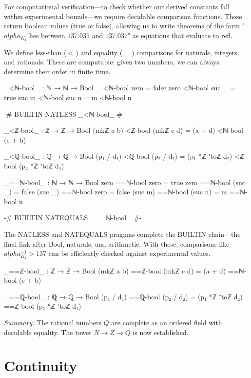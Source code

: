 \documentclass[11pt,a4paper]{book}
\def\alpha{alpha}%
\def\mathbb#1{#1}%
\def\texttt#1{#1}%
\begin{document}
For computational verification—to check whether our derived constants fall within experimental 
bounds—we require decidable comparison functions. These return boolean values (\texttt{true} 
or \texttt{false}), allowing us to write theorems of the form "$\alpha_{K_4}$ lies between 
$137.035$ and $137.037$" as equations that evaluate to \texttt{refl}.

We define less-than ($<$) and equality ($=$) comparisons for naturals, integers, and rationals. 
These are computable: given two numbers, we can always determine their order in finite time.

\begin{code}
_<ℕ-bool_ : ℕ → ℕ → Bool
_ <ℕ-bool zero = false
zero <ℕ-bool suc _ = true
suc m <ℕ-bool suc n = m <ℕ-bool n

{-# BUILTIN NATLESS _<ℕ-bool_ #-}

_<ℤ-bool_ : ℤ → ℤ → Bool
(mkℤ a b) <ℤ-bool (mkℤ c d) = (a + d) <ℕ-bool (c + b)

_<ℚ-bool_ : ℚ → ℚ → Bool
(p₁ / d₁) <ℚ-bool (p₂ / d₂) = 
  (p₁ *ℤ ⁺toℤ d₂) <ℤ-bool (p₂ *ℤ ⁺toℤ d₁)

_==ℕ-bool_ : ℕ → ℕ → Bool
zero ==ℕ-bool zero = true
zero ==ℕ-bool (suc _) = false
(suc _) ==ℕ-bool zero = false
(suc m) ==ℕ-bool (suc n) = m ==ℕ-bool n

{-# BUILTIN NATEQUALS _==ℕ-bool_ #-}
\end{code}

The \texttt{NATLESS} and \texttt{NATEQUALS} pragmas complete the BUILTIN chain—the final 
link after Bool, naturals, and arithmetic. With these, comparisons like $\alpha_{K_4}^{-1} > 137$ 
can be efficiently checked against experimental values.

\begin{code}
_==ℤ-bool_ : ℤ → ℤ → Bool
(mkℤ a b) ==ℤ-bool (mkℤ c d) = (a + d) ==ℕ-bool (c + b)

_==ℚ-bool_ : ℚ → ℚ → Bool
(p₁ / d₁) ==ℚ-bool (p₂ / d₂) = 
  (p₁ *ℤ ⁺toℤ d₂) ==ℤ-bool (p₂ *ℤ ⁺toℤ d₁)
\end{code}

\medskip
\noindent\textit{Summary:} The rational numbers $\mathbb{Q}$ are complete as an ordered field 
with decidable equality. The tower $\mathbb{N} \to \mathbb{Z} \to \mathbb{Q}$ is now established.

\chapter{Continuity}
\end{document}
